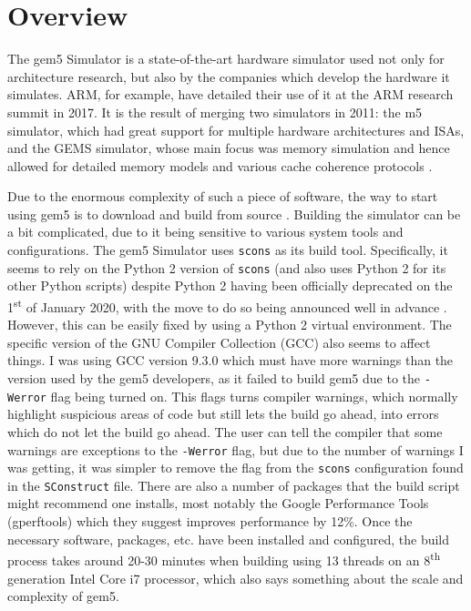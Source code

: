 \section{Overview}
The gem5 Simulator \cite{binkert_gem5_2011} is a state-of-the-art hardware 
simulator used not only for architecture research, but also by the companies 
which develop the hardware it simulates. ARM, for example, have detailed their 
use of it at the ARM research summit in 2017. It is the result of merging two 
simulators in 2011: the m5 simulator, which had great support for multiple 
hardware architectures and ISAs, and the GEMS simulator, whose main focus was 
memory simulation and hence allowed for detailed memory models and various 
cache coherence protocols \cite{binkert_gem5_2011}.

Due to the enormous complexity of such a piece of software, the way to start 
using gem5 is to download and build from source \cite{noauthor_gem5_nodate-2}. 
Building the simulator can be a bit complicated, due to it being sensitive to 
various system tools and configurations. The gem5 Simulator uses \texttt{scons} 
as its build tool. Specifically, it seems to rely on the Python 2 version of 
\texttt{scons} (and also uses Python 2 for its other Python scripts) despite 
Python 2 having been officially deprecated on the 1\textsuperscript{st} of 
January 2020, with the move to do so being announced well in advance 
\cite{noauthor_sunsetting_nodate}. However, this can be easily fixed by using a 
Python 2 virtual environment. The specific version of the GNU Compiler 
Collection (GCC) also seems to affect things. I was using GCC version 9.3.0 
which must have more warnings than the version used by the gem5 developers, as 
it failed to build gem5 due to the \texttt{-Werror} flag being turned on. This 
flags turns compiler warnings, which normally highlight suspicious areas of 
code but still lets the build go ahead, into errors which do not let the build 
go ahead. The user can tell the compiler that some warnings are exceptions to 
the \texttt{-Werror} flag, but due to the number of warnings I was getting, it 
was simpler to remove the flag from the \texttt{scons} configuration found in 
the \texttt{SConstruct} file. There are also a number of packages that the 
build script might recommend one installs, most notably the Google Performance 
Tools (gperftools) \cite{noauthor_google_nodate} which they suggest improves 
performance by 12\%. Once the necessary software, packages, etc. have been 
installed and configured, the build process takes around 20-30 minutes when 
building using 13 threads on an 8\textsuperscript{th} generation Intel Core i7 
processor, which also says something about the scale and complexity of gem5.

